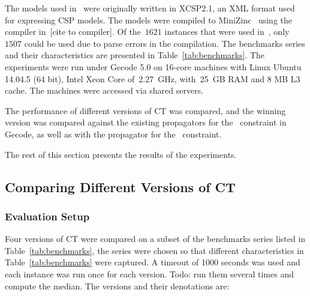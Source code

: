 \documentclass[a4paper,11pt]{article}
\newcommand{\Todo}[1]{{\color{blue}#1}}
\newcommand{\Secref}[1]{Section~\ref{#1}}
\newcommand{\Table}{\Constraint{Table}}
\newcommand{\CTpaper}[0]{DBLP:conf/cp/DemeulenaereHLP16}
\numberwithin{equation}{section}
\begin{document}
\clearpage

The models used in~\cite{\CTpaper} were originally written in XCSP2.1,
an XML format used for expressing CSP models. The models were compiled
to MiniZinc~\cite{MiniZinc} using the compiler in~\Todo{[cite to compiler]}.
Of the~$1621$ instances that were used in~\cite{\CTpaper},
only~$1507$ could be used due to parse errors in the compilation.
The benchmarks series and their characteristics are presented in Table~\ref{tab:benchmarks}.
The experiments were run
under Gecode 5.0 on 16-core machines with Linux Ubuntu 14.04.5 (64 bit),
Intel Xeon Core of~2.27~GHz, with~25~GB RAM and 8 MB L3 cache. The machines
were accessed via shared servers.

The performance of different versions of CT was compared, and the winning
version was compared against the existing propagators for
the \Table~constraint in Gecode, as well as with the propagator for the
~constraint.

The rest of this section presents the results of the experiments.






\subsection{Comparing Different Versions of CT}
\label{sec:compare}

\subsubsection{Evaluation Setup}
Four versions of CT were compared on a subset of the benchmarks
series listed in Table~\ref{tab:benchmarks}, the series were chosen so 
that different characteristics in Table~\ref{tab:benchmarks} were captured.
A timeout of 1000 seconds was
used and each instance was run once for each version.
\Todo{Todo: run them several times and compute the median.}
The versions and their denotations are:
\end{document}
